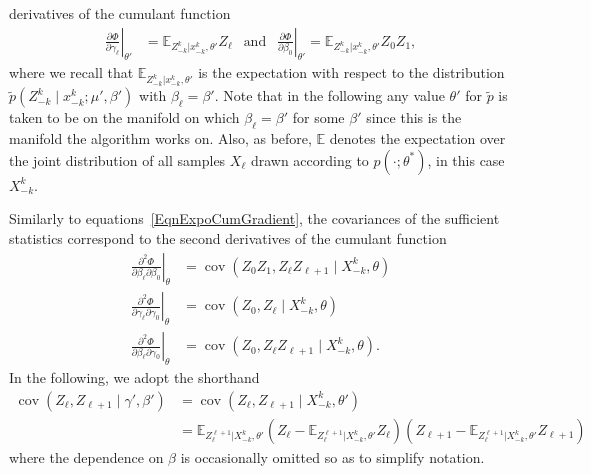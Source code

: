 \documentclass[twoside,11pt]{article}
\DeclareMathOperator{\cov}{cov}
\def\EE{ \mathbb{E} }
\newcommand{\EEzcondx}[3]{\ensuremath{\EE_{#1|#2,#3}}}
\newcommand{\generalp}{\tilde{p}}
\newcommand{\paramobs}{\mu}
\newcommand{\paramtrans}{\beta}
\newcommand{\paramjoint}{\theta}
\newcommand{\paramgamma}{\gamma}
\newcommand{\expcumgrad}[1]{\frac{\partial \Phi}{\partial #1}}
\newcommand{\expcumhess}[2]{\frac{\partial^2 \Phi}{\partial #1 \partial #2 }}
\newcommand{\condcov}[3]{\cov(#1, #2 \mid #3)}
\begin{document}
derivatives of the cumulant function
\begin{align}
 \label{EqnExpoCumGradient}
\left. \expcumgrad{\paramgamma_{\ell}}\right|_{\paramjoint'} &=
\EEzcondx{Z_{-k}^k}{x_{-k}^k}{\paramjoint'} Z_{\ell} \:\: \text{ and } \:\:
\left. \expcumgrad{\paramtrans_0} \right|_{\paramjoint'}=
\EEzcondx{Z_{-k}^k}{x_{-k}^k}{\paramjoint'} Z_0 Z_1,
\end{align}
 where we recall that $\EEzcondx{Z_{-k}^k}{x_{-k}^k}{\paramjoint'}$ is
 the expectation with respect to the distribution $\generalp(Z_{-k}^k
 \mid x_{-k}^k; \paramobs', \paramtrans')$ with $\paramtrans_\ell =
 \paramtrans'$.  Note that in the following any value $\paramjoint'$
 for $\generalp$ is taken to be on the manifold on which
 $\paramtrans_\ell = \paramtrans'$ for some $\paramtrans'$ since this
 is the manifold the algorithm works on. Also, as before, $\EE$
 denotes the expectation over the joint distribution of all samples
 $X_\ell$ drawn according to $p(\cdot; \paramjoint^*)$, in this case
 $X_{-k}^k$.

Similarly to equations~\eqref{EqnExpoCumGradient}, 
the covariances of the sufficient statistics correspond to
the second derivatives of the cumulant function
\begin{subequations}
\label{EqnExpoCumHessian}
\begin{align}
\left. \frac{\partial^2 \Phi}{\partial \paramtrans_\ell \partial
  \paramtrans_0} \right|_{\paramjoint} & = \condcov{ Z_{0}Z_1}{
  Z_{\ell} Z_{\ell+1} }{X_{-k}^k,\paramjoint} \\
%
 \left. \expcumhess{\paramgamma_{\ell}}{\paramgamma_0}
 \right|_{\paramjoint} &= \condcov{Z_0}{Z_{\ell}}{X_{-k}^k, \paramjoint} \\
%
\left. \expcumhess{\paramtrans_\ell}{\paramgamma_0} \right|_{\paramjoint} &
= \condcov{Z_0}{Z_{\ell}Z_{\ell+1}}{X_{-k}^k, \paramjoint}.
\end{align}
\end{subequations}
In the following, we adopt the shorthand
\begin{align*}
\condcov{Z_\ell}{Z_{\ell+1}}{\paramgamma', \paramtrans'} &=
\condcov{Z_\ell}{Z_{\ell+1}}{X_{-k}^k,\paramjoint'} \\ & =
\EEzcondx{Z_\ell^{\ell+1}}{X_{-k}^k}{\paramjoint'} (Z_\ell -
\EEzcondx{Z_{\ell}^{\ell+1}}{X_{-k}^k}{\paramjoint'}
Z_\ell)(Z_{\ell+1} -
\EEzcondx{Z_\ell^{\ell+1}}{X_{-k}^k}{\paramjoint'} Z_{\ell+1})
\end{align*}
where the dependence on $\paramtrans$ is occasionally omitted so as to
simplify notation.
\end{document}
